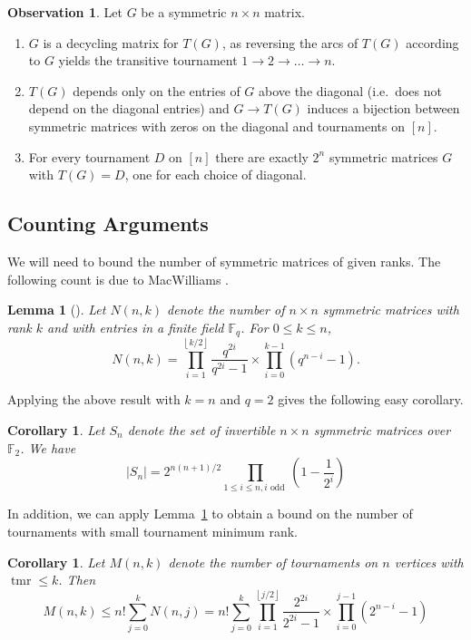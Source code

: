 \documentclass[a4paper, 12pt, reqno]{amsart}
\numberwithin{equation}{section}
\theoremstyle{plain}
\newtheorem{cor}[thm]{Corollary}
\newtheorem{lemma}[thm]{Lemma}
\theoremstyle{remark}
\theoremstyle{definition}
\newtheorem{obs}[thm]{Observation}
\newcommand{\lb}{\left(}
\newcommand{\rb}{\right)}
\newcommand{\tmr}{\operatorname{tmr}}
\begin{document}
\begin{obs} \label{G1}
    Let  $G$ be a symmetric $n \times n$ matrix.
    \begin{enumerate}
        \item $G$ is a decycling matrix for $T(G)$, as reversing the arcs of $T(G)$ according to $G$ yields the transitive tournament $1\to2\to\dots\to n$.
        \item $T(G)$ depends only on the entries of $G$ above the diagonal (i.e.~does not depend on the diagonal entries) and $G \to T(G)$ induces a bijection between symmetric matrices with zeros on the diagonal and tournaments on $[n]$.
        \item For every tournament $D$ on $[n]$ there are exactly $2^n$ symmetric matrices $G$ with $T(G) = D$, one for each choice of diagonal.  \label{item:2^n diagonal choices}
    \end{enumerate}
\end{obs}


\bigskip

\subsection{Counting Arguments}
We will need to bound the number of symmetric matrices of given ranks. The following count is due to MacWilliams \cite{MacW}. 

\begin{lemma}[{\cite[Theorem 2]{MacW}}] \label{lem:Mc1}
    Let $N(n,k)$ denote the number of $n \times n$  symmetric matrices with rank $k$ and with entries in a finite field $\mathbb{F}_q$. For $0 \leq k \le n$,
    \begin{equation*}
        N(n,k) = \prod_{i=1}^{\left \lfloor{k/2}\right \rfloor } \frac{q^{2i}}{q^{2i}-1} \times \prod_{i=0}^{k-1} (q^{n-i}-1).
    \end{equation*}
\end{lemma}

Applying the above result with $k =n$ and $q=2$ gives the following easy corollary.
 \begin{cor}  \label{lem:Mc2}
     Let $S_n$ denote the set of invertible $n\times n$ symmetric matrices over $\mathbb{F}_2$. We have
     \begin{equation*}
         |S_n| = 2^{n(n+1)/2} \prod_{1 \leq i \le n, i \text{ odd  }} \lb1-\frac{1}{2^i}\rb
     \end{equation*}
 \end{cor}

 
In addition, we can apply Lemma~\ref{lem:Mc1} to obtain a bound on the number of tournaments with small tournament minimum rank.
 \begin{cor} \label{lem:count}
     Let $M(n,k)$ denote the number of tournaments on $n$ vertices with ${\tmr \leq k}$. Then 
     \begin{equation*}
         M(n,k) \leq n! \sum_{j=0}^k N(n,j) = n!  \sum_{j=0}^k \prod_{i=1}^{\left \lfloor{j/2}\right \rfloor } \frac{2^{2i}}{2^{2i}-1} \times \prod_{i=0}^{j-1} (2^{n-i}-1)
     \end{equation*}
 \end{cor}
\end{document}
